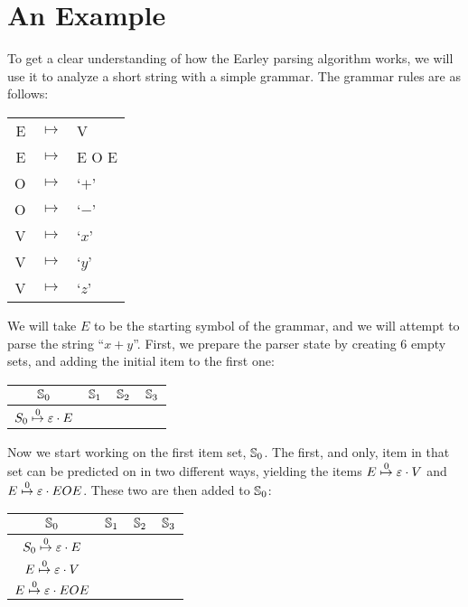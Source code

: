 	\section{An Example}

		
		To get a clear understanding of how the Earley parsing algorithm works,
		we will use it to analyze a short string with a simple grammar. The 
		grammar rules are as follows:
		
		\begin{table}[h]
		\centering
		\begin{tabular}{rcl}
			E & $ \mapsto $ & V \\
			E & $ \mapsto $ & E O E \\
			O & $ \mapsto $ & `$+$' \\
			O & $ \mapsto $ & `$-$' \\
			V & $ \mapsto $ & `$x$' \\
			V & $ \mapsto $ & `$y$' \\
			V & $ \mapsto $ & `$z$' 
		\end{tabular}
		\end{table}

		We will take $E$ to be the starting symbol of the grammar, and we will 
		attempt to parse the string ``$x+y$''. First, we prepare the parser 
		state by creating 6 empty sets, and adding the initial item to the 
		first one:

		\begin{table}[h]
		\centering
		\begin{tabular}{|c|c|c|c|}
			\hline
			$\St{0}$ & $\St{1}$ & $\St{2}$ & $\St{3}$ \\ 
			\hline
			$\earley{S_0}{\varepsilon}{E}{0}$ & & & \\
			\hline
		\end{tabular}
		\end{table}

		Now we start working on the first item set, $\St{0}$. The first, and
		only, item in that set can be predicted on in two different ways,
		yielding the items $\earley{E}{\varepsilon}{V}{0}$ and
		$\earley{E}{\varepsilon}{EOE}{0}$. These two are then added to
		$\St{0}$:

		\begin{table}[h]
		\centering
		\begin{tabular}{|c|c|c|c|}
			\hline
			$\St{0}$ & $\St{1}$ & $\St{2}$ & $\St{3}$ \\ 
			\hline
			$\earley{S_0}{\varepsilon}{E}{0}$ & & & \\
			$\earley{E}{\varepsilon}{V}{0}$   & & & \\
			$\earley{E}{\varepsilon}{EOE}{0}$ & & & \\
			\hline
		\end{tabular}
		\end{table}


